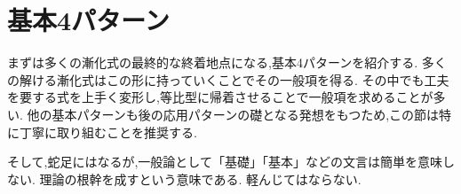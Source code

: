 
\section{基本4パターン}
  まずは多くの漸化式の最終的な終着地点になる,基本4パターンを紹介する.
  多くの解ける漸化式はこの形に持っていくことでその一般項を得る.
  その中でも工夫を要する式を上手く変形し,等比型に帰着させることで一般項を求めることが多い.
  他の基本パターンも後の応用パターンの礎となる発想をもつため,この節は特に丁寧に取り組むことを推奨する.
  
  そして,蛇足にはなるが,一般論として「基礎」「基本」などの文言は簡単を意味しない.
  理論の根幹を成すという意味である.
  軽んじてはならない.





